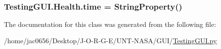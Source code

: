 \subsubsection[{\texorpdfstring{time}{time}}]{\setlength{\rightskip}{0pt plus 5cm}Testing\+G\+U\+I.\+Health.\+time = String\+Property()\hspace{0.3cm}{\ttfamily [static]}}\hypertarget{classTestingGUI_1_1Health_a54e3f1adc11ad4d864b67012799706ac}{}\label{classTestingGUI_1_1Health_a54e3f1adc11ad4d864b67012799706ac}


The documentation for this class was generated from the following file\+:\begin{DoxyCompactItemize}
\item 
/home/jac0656/\+Desktop/\+J-\/\+O-\/\+R-\/\+G-\/\+E/\+U\+N\+T-\/\+N\+A\+S\+A/\+G\+U\+I/\hyperlink{GUI_2TestingGUI_8py}{Testing\+G\+U\+I.\+py}\end{DoxyCompactItemize}
